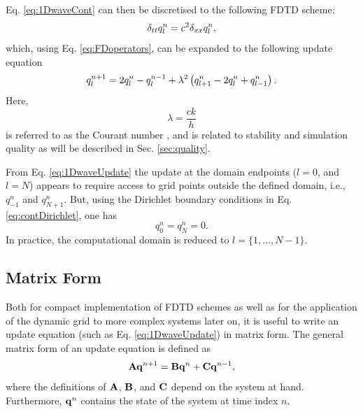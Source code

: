 \documentclass[fleqn]{jaes}
\def\SBcomment[#1]{\textcolor{red}{#1}}
\def\SWcomment[#1]{\textcolor{blue}{#1}}
\begin{document}
Eq. \eqref{eq:1DwaveCont} can then be discretised to the following FDTD scheme:
\begin{equation}\label{eq:1dWaveDisc}
    \dtt \qln = c^2 \dxx \qln,
\end{equation}
which, using Eq. \eqref{eq:FDoperators}, can be expanded to the following update equation
\begin{equation}\label{eq:1DwaveUpdate}
    q_l^{n+1} = 2 \qln - q_l^{n-1} + \lambda^2 \left(q_{l+1}^n -2\qln + q_{l-1}^n\right).
\end{equation}
Here, 
\begin{equation}\label{eq:courant}
    \lambda = \frac{c k}{h}
\end{equation} is referred to as the Courant number \cite{Courant1928}, and is related to stability and simulation quality as will be described in Sec. \ref{sec:quality}.

From Eq. \eqref{eq:1DwaveUpdate} the update at the domain endpoints ($l=0$, and $l=N$) appears to require access to grid points outside the defined domain, i.e., $q_{-1}^n$ and $q_{N+1}^n$. But, using the Dirichlet boundary conditions in Eq. \eqref{eq:contDirichlet}, one has 
\begin{equation}\label{eq:discDirichlet}
    q_0^n = q_N^n = 0.
\end{equation}
In practice, the computational domain is reduced to $l=\{1, \hdots, N-1\}$. 

\subsection{Matrix Form}\label{sec:matrixFormOrig}
Both for compact implementation of FDTD schemes as well as for the application of the dynamic grid to more complex systems later on, it is useful to write an update equation (such as Eq. \eqref{eq:1DwaveUpdate}) in matrix form. The general matrix form of an update equation is defined as
\begin{equation}\label{eq:generalMatrixUpdate}
    \A \q^{n+1} = \B \q^n + \C \q^{n-1},
\end{equation}
where the definitions of $\mathbf{A}$, $\mathbf{B}$, and $\mathbf{C}$ depend on the system at hand. Furthermore, $\mathbf{q}^n$ contains the state of the system at time index $n$. 
\end{document}
